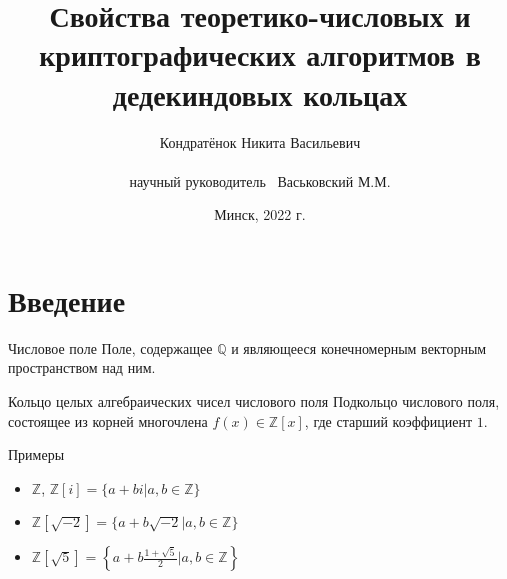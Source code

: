 \documentclass[8pt, xcolor=x11names]{beamer}
\author[Кондратёнок Н.В.]{
    Кондратёнок Никита Васильевич\\
    \ \\
    научный руководитель \textendash\ Васьковский М.М.%
}
\title[]{
    Свойства теоретико-числовых и криптографических алгоритмов в дедекиндовых кольцах
}
\institute[Кафедра высшей математики]{Кафедра высшей математики}
\date{Минск, 2022 г.}
\begin{document}
\begin{frame}
    \titlepage
\end{frame}

\section{Введение}

\begin{frame}
    \begin{block}{Числовое поле}
        Поле, содержащее $\mathbb{Q}$ и являющееся конечномерным векторным пространством над ним.
    \end{block}

    \begin{block}{Кольцо целых алгебраических чисел числового поля}
        Подкольцо числового поля, состоящее из корней многочлена $f(x) \in \mathbb{Z}[x]$, где старший коэффициент $1$.
    \end{block}
    
    \begin{block}{Примеры}
        \begin{itemize}
            \item $\mathbb{Z}$, $\mathbb{Z}[i] = \{a + bi | a, b\in\mathbb{Z}\}$
            \item $\mathbb{Z}[\sqrt{-2}] = \{a + b\sqrt{-2} | a, b\in\mathbb{Z}\}$
            \item $\mathbb{Z}[\sqrt{5}] = \left\{a + b\frac{1+\sqrt{5}}{2} | a, b\in\mathbb{Z}\right\}$
        \end{itemize}
    \end{block}
\end{frame}
\end{document}

